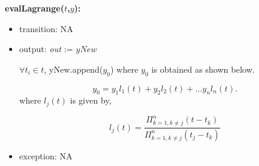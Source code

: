 \documentclass[12pt, titlepage]{article}
\begin{document}
\noindent \textbf{evalLagrange($t$,$y$):}
\begin{itemize}
	\item transition: NA
	
	\item output:  \textit{out} := $yNew$
	
	$\forall t_i \in t$, yNew.append($y_0$) where $y_0$ is obtained as shown 
	below.
	
	\begin{equation*}
	y_0 = y_1 l_1 (t) + y_2 l_2(t) + \dots y_n l_n (t).
	\end{equation*}
	where $l_j (t)$ is given by,
	
	
	\begin{equation*}
	l_j (t) =  \frac{ \Pi _{k=1, k\neq j} ^n (t - t_k)} {\Pi _{k=1,k \neq j} ^n 
		(t_j - t_k)}
	\end{equation*}
	\item exception: NA
\end{itemize}


~\newline
~\newline
\end{document}
